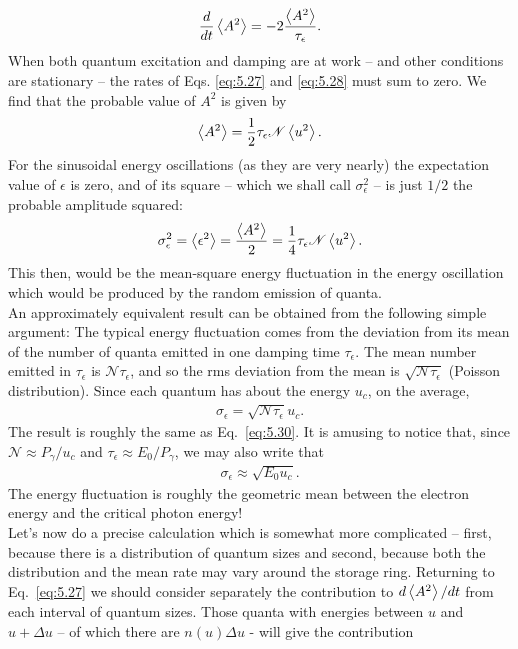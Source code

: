 \begin{align} \label{eq:5.28}
	\dfrac{d}{dt}\left< A^2 \right> = -2 \dfrac{\left< A^2 \right>}{\tau_\epsilon}.
\end{align}
When both quantum excitation and damping are at work -- and other conditions are
stationary -- the rates of Eqs. \eqref{eq:5.27} and \eqref{eq:5.28} must sum to zero. We find that the probable value of $A^2$ is given by
\begin{align}
	\left< A^2 \right> = \dfrac{1}{2} \tau_\epsilon \mathscr{N} \left< u^2 \right>.
\end{align}
For the sinusoidal energy oscillations (as they are very nearly) the expectation value of $\epsilon$ is zero, and of its square -- which we shall call $\sigma_\epsilon^2$ -- is just $1/2$ the probable amplitude squared:
\begin{align}\label{eq:5.30}
	\sigma_\epsilon^2 = \left< \epsilon^2 \right> = \dfrac{\left< A^2 \right>}{2} = \dfrac{1}{4} \tau_\epsilon \mathscr{N} \left< u^2 \right>.
\end{align}
This then, would be the mean-square energy fluctuation in the energy oscillation which would be produced by the random emission of quanta.\\
An approximately equivalent result can be obtained from the following simple argument: The typical energy fluctuation comes from the deviation from its mean of the number of quanta emitted in one damping time $\tau_\epsilon$. The mean number emitted in $\tau_\epsilon$ is $\mathscr{N}\tau_\epsilon$, and so the rms deviation from the mean is $\sqrt{\mathscr{N}\tau_\epsilon}$ (Poisson distribution). Since each quantum has about the energy $u_c$, on the average,
\begin{align}
	\sigma_\epsilon = \sqrt{\mathscr{N}\tau_\epsilon} u_c.
\end{align}
The result is roughly the same as Eq.~\eqref{eq:5.30}. It is amusing to notice that, since $\mathscr{N} \approx P_\gamma/u_c$ and $\tau_\epsilon \approx E_0/P_\gamma$, we may also write that
\begin{align} \label{eq:5.32}
	\sigma_\epsilon \approx \sqrt{E_0 u_c}.
\end{align}
The energy fluctuation is roughly the geometric mean between the electron energy and the critical
 photon energy!\\
Let's now do a precise calculation which is somewhat more complicated -- first, because there is a distribution of quantum sizes and second, because both the distribution and the mean rate may vary around the storage ring. Returning to Eq.~\eqref{eq:5.27} we should consider separately the contribution to $d\left< A^2 \right>/dt$ from each interval of quantum sizes. Those quanta with energies between $u$ and $u + \Delta u$ -- of which there are $n(u)\Delta u$ - will give the contribution
